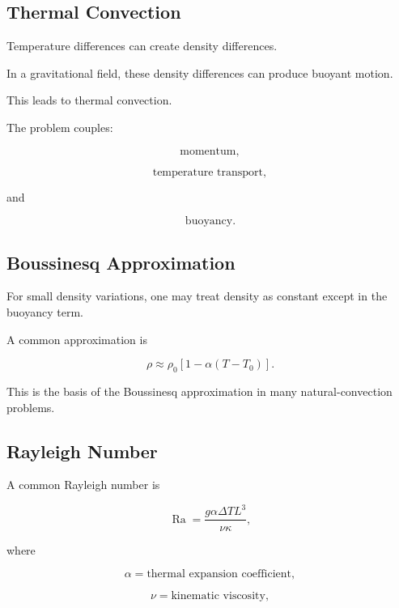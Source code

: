 \subsection{Thermal Convection}
\label{subsec:thermal-convection}

Temperature differences can create density differences.

In a gravitational field, these density differences can produce buoyant
motion.

This leads to thermal convection.

The problem couples:

\[
\boxed{
\text{momentum},
}
\]

\[
\boxed{
\text{temperature transport},
}
\]

and

\[
\boxed{
\text{buoyancy}.
}
\]

\subsection{Boussinesq Approximation}
\label{subsec:boussinesq-approximation}

For small density variations, one may treat density as constant except in
the buoyancy term.

A common approximation is

\[
\boxed{
\rho
\approx
\rho_0
\left[
1-\alpha(T-T_0)
\right].
}
\]

This is the basis of the Boussinesq approximation in many natural-convection
problems.

\subsection{Rayleigh Number}
\label{subsec:rayleigh-number}

A common Rayleigh number is

\[
\boxed{
\operatorname{Ra}
=
\frac{
g\alpha\Delta T L^3
}{
\nu\kappa
},
}
\]

where

\[
\alpha
=
\text{thermal expansion coefficient},
\]

\[
\nu
=
\text{kinematic viscosity},
\]

